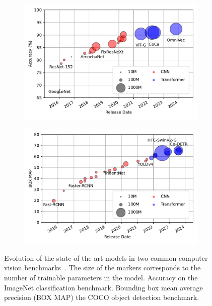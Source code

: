 \begin{figure}[h]
    \centering
    \begin{subfigure}[b]{0.49\textwidth}
        \centering
        \includegraphics[width=\textwidth]{Figures/transformers/imagenet.pdf}
        \caption{}
        \label{fig:imagenet}
    \end{subfigure}
    \hfill
    \begin{subfigure}[b]{0.49\textwidth}
        \centering
        \includegraphics[width=\textwidth]{Figures/transformers/coco.pdf}
        \caption{}
        \label{fig:coco}
    \end{subfigure}
    \caption{Evolution of the state-of-the-art models in two common computer vision benchmarks~\cite{paperswithcode}. The size of the markers corresponds to the number of trainable parameters in the model.  Accuracy on the ImageNet classification benchmark.  Bounding box mean average precision (BOX MAP) the COCO object detection benchmark.}
    \label{fig:benchmarks}
\end{figure}

